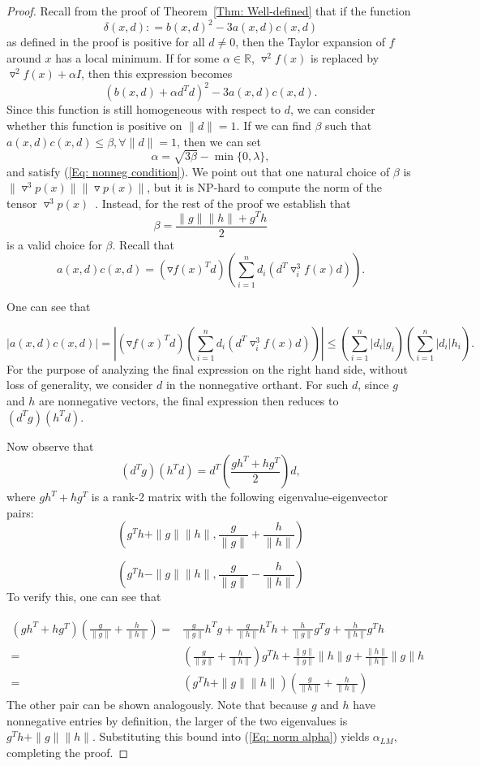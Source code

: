 \documentclass[11pt]{article}
\theoremstyle{plain}
\theoremstyle{definition}
\theoremstyle{remark}
\def \defeq{\mathrel{\mathop{:}}=}
\def \grad{\triangledown}
\def \Hess{\triangledown^2}
\def \R{\mathbb{R}}
\def \beq{\begin{equation}}
\def \eeq{\end{equation}}
\def \baeq{\begin{equation*}\begin{aligned}}
\def \eaeq{\end{aligned}\end{equation*}}
\begin{document}
\begin{proof}
Recall from the proof of Theorem~\ref{Thm: Well-defined} that if the function \beq  \delta(x,d) \defeq b(x,d)^2 - 3a(x,d)c(x,d) \eeq as defined in the proof is positive for all $d \ne 0$, then the Taylor expansion of $f$ around $x$ has a local minimum. If for some $\alpha \in \R$, $\Hess f(x)$ is replaced by $\Hess f(x) + \alpha I$, then this expression becomes
\beq \label{Eq: nonneg condition} (b(x,d) + \alpha d^Td)^2 - 3a(x,d)c(x,d).\eeq
Since this function is still homogeneous with respect to $d$, we can consider whether this function is positive on $\|d\| = 1$. If we can find $\beta$ such that $a(x,d)c(x,d) \le \beta, \forall \|d\| = 1$, then we can set
\beq \label{Eq: norm alpha} \alpha = \sqrt{3\beta} - \min\{0, \lambda\},\eeq
and satisfy (\ref{Eq: nonneg condition}). We point out that one natural choice of $\beta$ is $\|\grad^3 p(x)\| \|\grad p(x)\|$, but it is NP-hard to compute the norm of the tensor $\grad^3 p(x)$~\cite{hillar2013most}. Instead, for the rest of the proof we establish that \beq\label{Eq: 3ac bound} \beta = \frac{\|g\|\|h\| + g^Th}{2}\eeq
is a valid choice for $\beta$. Recall that
$$a(x,d)c(x,d) = \left(\grad f(x)^Td\right)\left(\sum_{i=1}^n d_i (d^T\grad_i^3 f(x)d)\right).$$

One can see that

$$\left|a(x,d)c(x,d)\right| = \left|(\grad f(x)^Td)(\sum_{i=1}^n d_i (d^T\grad_i^3 f(x)d))\right| \le \left(\sum_{i=1}^n |d_i|g_i\right)\left(\sum_{i=1}^n |d_i|h_i\right).$$
For the purpose of analyzing the final expression on the right hand side, without loss of generality, we consider $d$ in the nonnegative orthant. For such $d$, since $g$ and $h$ are nonnegative vectors, the final expression then reduces to $(d^Tg)(h^Td).$

Now observe that
$$(d^Tg)(h^Td) = d^T \left(\frac{gh^T + hg^T}{2}\right)d,$$ where $gh^T + hg^T$ is a rank-2 matrix with the following eigenvalue-eigenvector pairs:
$$\left(g^Th + \|g\|\|h\|, \frac{g}{\|g\|} + \frac{h}{\|h\|}\right)$$

$$\left(g^Th - \|g\|\|h\|, \frac{g}{\|g\|} - \frac{h}{\|h\|}\right)$$
To verify this, one can see that

\baeq\left(gh^T + hg^T\right)\left(\frac{g}{\|g\|} + \frac{h}{\|h\|}\right) =& \frac{g}{\|g\|}h^Tg + \frac{g}{\|h\|}h^Th + \frac{h}{\|g\|}g^Tg + \frac{h}{\|h\|}g^Th\\
=&\left(\frac{g}{\|g\|} + \frac{h}{\|h\|}\right)g^Th + \frac{\|g\|}{\|g\|}\|h\|g + \frac{\|h\|}{\|h\|}\|g\|h\\
=& (g^Th + \|g\|\|h\|)\left(\frac{g}{\|h\|} + \frac{h}{\|h\|}\right) &\eaeq
The other pair can be shown analogously. Note that because $g$ and $h$ have nonnegative entries by definition, the larger of the two eigenvalues is $g^Th + \|g\|\|h\|$. Substituting this bound into (\ref{Eq: norm alpha}) yields $\alpha_{LM}$, completing the proof.
\end{proof}
\end{document}
